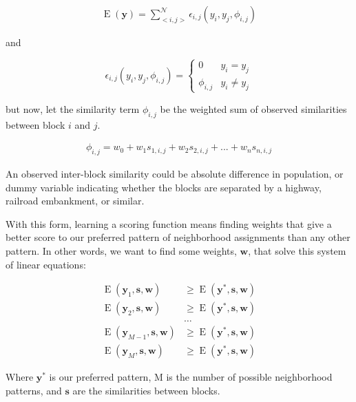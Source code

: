 \begin{align}
\operatorname{E}(\mathbf{y}) = \sum_{<i,j>}^{\mathcal{N}}\epsilon_{i,j}(y_i,y_j,\phi_{i,j})
\end{align}

\noindent
and

\begin{equation}
\epsilon_{i,j}(y_i,y_j,\phi_{i,j}) = \begin{cases}
  0 &y_i = y_j \\
  \phi_{i,j} &y_i \neq y_j
\end{cases}
\end{equation}

\noindent
but now, let the similarity term $\phi_{i,j}$ be the weighted sum of
observed similarities between block $i$ and $j$. 

\begin{align}
\phi_{i,j} = w_0 + w_1s_{1,i,j} + w_2s_{2,i,j} + ... + w_ns_{n,i,j}
\end{align} 

\noindent
An observed inter-block similarity could be absolute difference in
population, or dummy variable indicating whether the blocks are
separated by a highway, railroad embankment, or similar.

\noindent

With this form, learning a scoring function means finding weights
that give a better score to our preferred pattern of neighborhood
assignments than any other pattern. In other words, we want to find
some weights, $\mathbf{w}$, that solve this system of linear
equations:

\begin{align*}
\operatorname{E}(\mathbf{y}_1, \mathbf{s}, \mathbf{w})
&\geq \operatorname{E}(\mathbf{y}^*, \mathbf{s}, \mathbf{w}) \\
\operatorname{E}(\mathbf{y}_2, \mathbf{s}, \mathbf{w})
&\geq \operatorname{E}(\mathbf{y}^*, \mathbf{s}, \mathbf{w}) \\
&\ldots \\
\operatorname{E}(\mathbf{y}_{M-1}, \mathbf{s}, \mathbf{w})
&\geq \operatorname{E}(\mathbf{y}^*, \mathbf{s}, \mathbf{w}) \\
\operatorname{E}(\mathbf{y}_{M}, \mathbf{s}, \mathbf{w})
&\geq \operatorname{E}(\mathbf{y}^*, \mathbf{s}, \mathbf{w})
\end{align*}

Where $\mathbf{y}^*$ is our preferred pattern, M is the number of
possible neighborhood patterns, and $\mathbf{s}$ are the similarities
between blocks.

